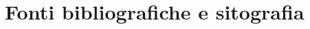 \documentclass[a4paper,12pt,oneside]{book}
\begin{document}
\frontmatter




\mainmatter





\backmatter
\nocite{*}
\chapter{Fonti bibliografiche e sitografia}
\renewcommand{\bibsection}{}

\listoffigures
\end{document}
